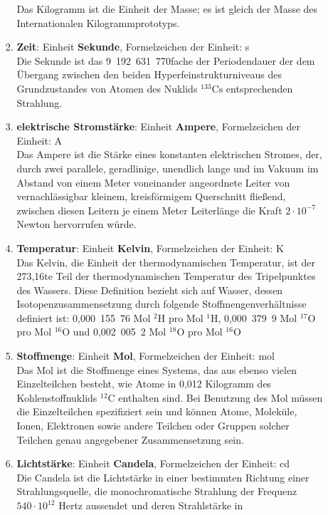 \documentclass[a4paper,12pt,DIV=15]{scrartcl}
\begin{document}
\begin{enumerate}
\begin{itemize}
\begin{enumerate}[1.)]
			Das Kilogramm ist die Einheit der Masse;
			es ist gleich der Masse des Internationalen Kilogrammprototyps.
		\item \textbf{Zeit}: Einheit \textbf{Sekunde}, Formelzeichen der Einheit: s\\
			Die Sekunde ist das 9~192~631~770fache der Periodendauer
			der dem Übergang zwischen den beiden
			Hyperfeinstrukturniveaus des Grundzustandes von
			Atomen des Nuklids $^{133}\mathrm{Cs}$ entsprechenden Strahlung.
		\item \textbf{elektrische Stromstärke}: Einheit \textbf{Ampere}, Formelzeichen der Einheit: A\\
			Das Ampere ist die Stärke eines konstanten elektrischen
			Stromes, der, durch zwei parallele, geradlinige, unendlich lange
			und im Vakuum im Abstand von einem Meter voneinander
			angeordnete Leiter von vernachlässigbar kleinem, kreisförmigem
			Querschnitt fließend, zwischen diesen Leitern je einem Meter
			Leiterlänge die Kraft $2 \cdot 10^{-7}$ Newton hervorrufen würde.
		\item \textbf{Temperatur}: Einheit \textbf{Kelvin}, Formelzeichen der Einheit: K\\
			Das Kelvin, die Einheit der thermodynamischen Temperatur,
			ist der 273,16te Teil der thermodynamischen Temperatur des
			Tripelpunktes des Wassers. Diese Definition bezieht sich auf
			Wasser, dessen Isotopenzusammensetzung durch folgende
			Stoffmengenverhältnisse definiert ist: 0,000~155~76 Mol $^2\mathrm{H}$ pro
			Mol $^1\mathrm{H}$, 0,000~379~9 Mol $^{17}\mathrm{O}$ pro Mol $^{16}\mathrm{O}$
			und 0,002~005~2 Mol $^{18}\mathrm{O}$ pro Mol $^{16}\mathrm{O}$
		\item \textbf{Stoffmenge}: Einheit \textbf{Mol}, Formelzeichen der Einheit: mol\\
			Das Mol ist die Stoffmenge eines Systems, das aus ebenso vielen
			Einzelteilchen besteht, wie Atome in 0,012 Kilogramm des
			Kohlenstoffnuklids $^{12}\mathrm{C}$ enthalten sind. Bei Benutzung des Mol
			müssen die Einzelteilchen spezifiziert sein und können Atome, Moleküle,
			Ionen, Elektronen sowie andere Teilchen oder Gruppen solcher
			Teilchen genau angegebener Zusammensetzung sein.
		\item \textbf{Lichtstärke}: Einheit \textbf{Candela}, Formelzeichen der Einheit: cd\\
			Die Candela ist die Lichtstärke in einer bestimmten Richtung
			einer Strahlungsquelle, die monochromatische Strahlung der
			Frequenz $540 \cdot 10^{12}$ Hertz aussendet und deren Strahlstärke in

\end{enumerate}
\end{itemize}
\end{enumerate}
\end{document}
